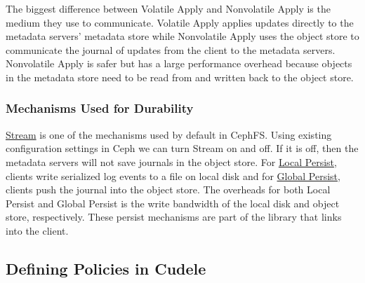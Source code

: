 The biggest difference between Volatile Apply and Nonvolatile Apply is
the medium they use to communicate. Volatile Apply applies updates directly
to the metadata servers' metadata store while Nonvolatile Apply uses the
object store to communicate the journal of updates from the client to the
metadata servers.  Nonvolatile Apply is safer but has a large performance
overhead because objects in the metadata store need to be read from and written
back to the object store.


\subsubsection{Mechanisms Used for Durability} \underline{Stream} is one of the
mechanisms used by default in CephFS.  Using existing configuration settings in
Ceph we can turn Stream on and off.  If it is off, then the metadata servers
will not save journals in the object store. For \underline{Local Persist}, clients write
serialized log events to a file on local disk and for \underline{Global Persist},
clients push the journal into the object store. The overheads for both Local
Persist and Global Persist is the write bandwidth of the local disk and
object store, respectively.  These persist mechanisms are part of the library that
links into the client.

\subsection{Defining Policies in Cudele}
\label{sec:setting-policies-with-cudele}

